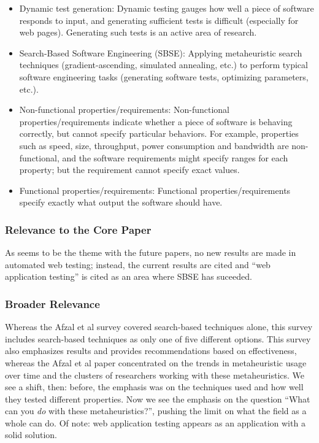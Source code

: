 \documentclass{sig-alternate-05-2015}
\begin{document}
\begin{itemize}
\item Dynamic test generation: Dynamic testing gauges how well a piece of software responds to input, and generating sufficient tests is difficult (especially for web pages). Generating such tests is an active area of research.
\item Search-Based Software Engineering (SBSE): Applying metaheuristic search techniques (gradient-ascending, simulated annealing, etc.) to perform typical software engineering tasks (generating software tests, optimizing parameters, etc.).
\item Non-functional properties/requirements: Non-functional properties/requirements indicate whether a piece of software is behaving correctly, but cannot specify particular behaviors. For example, properties such as speed, size, throughput, power consumption and bandwidth are non-functional, and the software requirements might specify ranges for each property; but the requirement cannot specify exact values.
\item Functional properties/requirements: Functional properties/requirements specify exactly what output the software should have.

\end{itemize}

\subsubsection{Relevance to the Core Paper}
As seems to be the theme with the future papers, no new results are made in automated web testing; instead, the current results are cited and ``web application testing'' is cited as an area where SBSE has suceeded. 

\subsubsection{Broader Relevance}
Whereas the Afzal et al survey covered search-based techniques alone, this survey includes search-based techniques as only one of five different options. This survey also emphasizes results and provides recommendations based on effectiveness, whereas the Afzal et al paper concentrated on the trends in metaheuristic usage over time and the clusters of researchers working with these metaheuristics. We see a shift, then: before, the emphasis was on the techniques used and how well they tested different properties. Now we see the emphasis on the question ``What can you \emph{do} with these metaheuristics?'', pushing the limit on what the field as a whole can do. Of note: web application testing appears as an application with a solid solution. 
\end{document}
